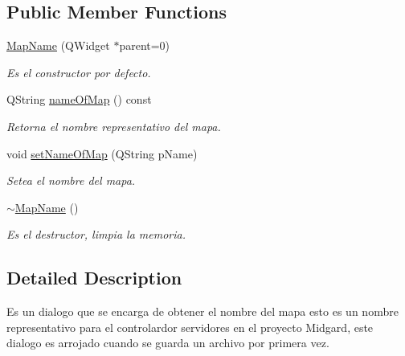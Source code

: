 \subsection*{Public Member Functions}
\begin{DoxyCompactItemize}
\item 
\hyperlink{class_map_name_a180dde809a405229689bfb7d84145701}{Map\-Name} (Q\-Widget $\ast$parent=0)
\begin{DoxyCompactList}\small\item\em Es el constructor por defecto. \end{DoxyCompactList}\item 
Q\-String \hyperlink{class_map_name_a0c7db97256abcc52b7e7321d0c86c67d}{name\-Of\-Map} () const 
\begin{DoxyCompactList}\small\item\em Retorna el nombre representativo del mapa. \end{DoxyCompactList}\item 
void \hyperlink{class_map_name_a74a823e51c1e47ee0e76abec43a3fd05}{set\-Name\-Of\-Map} (Q\-String p\-Name)
\begin{DoxyCompactList}\small\item\em Setea el nombre del mapa. \end{DoxyCompactList}\item 
\hypertarget{class_map_name_a341bb66bf5d06a9ff0a41ffa289893bb}{\hyperlink{class_map_name_a341bb66bf5d06a9ff0a41ffa289893bb}{$\sim$\-Map\-Name} ()}\label{class_map_name_a341bb66bf5d06a9ff0a41ffa289893bb}

\begin{DoxyCompactList}\small\item\em Es el destructor, limpia la memoria. \end{DoxyCompactList}\end{DoxyCompactItemize}


\subsection{Detailed Description}
Es un dialogo que se encarga de obtener el nombre del mapa esto es un nombre representativo para el controlardor servidores en el proyecto Midgard, este dialogo es arrojado cuando se guarda un archivo por primera vez. 

